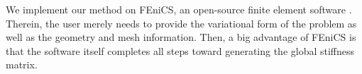 %
%

We implement our method on FEniCS, an open-source finite element software \cite[pp.~173--225]{Logg2012}. Therein, the user merely needs to provide the variational form of the problem as well as the geometry and mesh information. Then, a big advantage of FEniCS is that the software itself completes all steps toward generating the global stiffness matrix.



